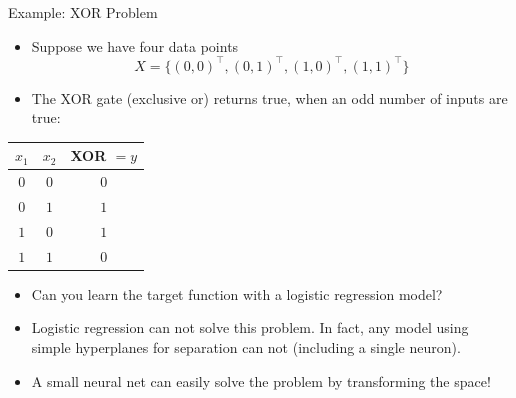 \begin{vbframe}{Example: XOR Problem}
  \begin{itemize}
    \item Suppose we have four data points $$X = \{(0,0)^\top, (0,1)^\top, (1,0)^\top, (1,1)^\top \}$$
    \item The XOR gate (exclusive or) returns true, when an odd number of inputs are true:
  \end{itemize}
  \begin{table}
    \centering
      \begin{tabular}{ccc}
        \textbf{$x_1$}  & \textbf{$x_2$}  & \textbf{XOR} $= y$ \\
        \hline
        \hline
        $0$             &   $0$           &  $0$ \\
        $0$             &   $1$           &  $1$ \\
        $1$             &   $0$           &  $1$ \\
        $1$             &   $1$           &  $0$
      \end{tabular}
  \end{table}
  \begin{itemize}
    \item Can you learn the target function with a logistic regression model? \\
  \end{itemize}
\framebreak
  \begin{minipage}{0.45\textwidth}
    \begin{itemize}
      \item Logistic regression can not solve this problem. %
      In fact, any model using simple hyperplanes for separation can not (including a single neuron).
      \lz
      \item A small neural net can easily solve the problem by transforming the space!
    \end{itemize}
  \end{minipage}
  \begin{minipage}{0.5\textwidth}

\end{minipage}
\end{vbframe}
